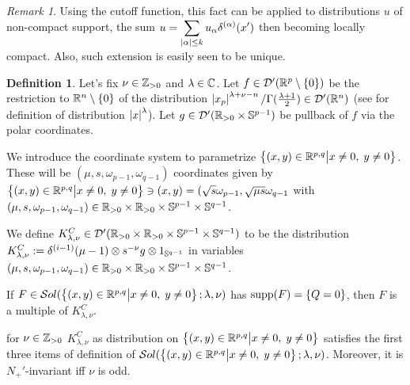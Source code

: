 \documentclass[10pt]{article} %
\newcommand{\D}{\mathcal{D}}
\theoremstyle{definition}
\newtheorem{mydef}{Definition}[section]
\theoremstyle{remark}
\newtheorem*{remark}{Remark}
\begin{document}
\begin{remark}
	Using the cutoff function, this fact can be applied to distributions $u$ of non-compact support, the sum 
	$u=\sum_{\myabs{\alpha}\leq k}u_{\alpha}\delta^{(\alpha)}(x')$
	then becoming locally compact. Also, such extension is easily seen to be unique.
\end{remark}
\begin{mydef}
	Let's fix $\nu\in\Z_{>0}$ and $\lambda\in\C$. Let $f\in\D'(\R^p\setminus\left\{ 0 \right\})$ be the restriction to 
	$\R^n\setminus\left\{ 0 \right\}$ of the distribution $\myabs{x_p}^{\lambda+\nu-n}/\Gamma(\frac{\lambda+1}{2})\in\D'(\R^n)$
	(see \cite[ch. III, sec. 3.2, 3.3]{gelfand1980distribution} for definition of distribution $\myabs{x}^\lambda$).
	Let $g\in\D'(\R_{>0}\times\Sp^{p-1})$ be pullback of $f$ via the polar coordinates.

	We introduce the coordinate system to parametrize $\Upp$.
	These will be $(\mu,s,\omega_{p-1},\omega_{q-1})$ coordinates given by $\mysetn{(x,y)\in\R^{p,q}}{
	x\neq0,\;y\neq0}\ni(x,y)=(\sqrt{s}\omega_{p-1},\sqrt{\mu s}\omega_{q-1}$ with $(\mu,s,\omega_{p-1},\omega_{q-1})\in
	\R_{>0}\times\R_{>0}\times \Sp^{p-1}\times\Sp^{q-1}$.

	We define $K^C_{\lambda,\nu}\in\D'(\R_{>0}\times\R_{>0}\times\Sp^{p-1}\times\Sp^{q-1})$ to be the distribution
	$K^C_{\lambda,\nu}:=\delta^{(i-1)}(\mu-1)\otimes s^{-\nu}g\otimes 1_{\Sp^{q-1}}
	$ in variables $(\mu,s,\omega_{p-1},\omega_{q-1})\in\R_{>0}\times\R_{>0}\times\Sp^{p-1}\times\Sp^{q-1}$.
\end{mydef}
\begin{mylem}
	\label{lem:sing_q_6}
	If $F\in\sol[\Upp]$ has $\supp(F)=\left\{ Q=0 \right\}$,
	then $F$ is a multiple of $K^C_{\lambda,\nu}$.
\end{mylem}
\begin{mylem}
	\label{lem:sing_q_7}
	for $\nu\in\Z_{>0}$
	$K^C_{\lambda,\nu}$ as distribution on $\Upp$ satisfies the first three items of definition of $\sol[\Upp]$.
	Moreover, it is $N_+'$-invariant iff $\nu$ is odd.
\end{mylem}
\end{document}
